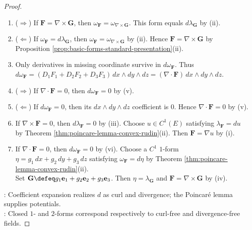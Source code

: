 \begin{theorem}
\begin{proof}
\begin{enumerate}[label=(\roman*)]
\item[$(iv)$] ($\Rightarrow$) If $\mathbf{F}=\nabla\times\mathbf{G}$, then $\omega_{\mathbf{F}}=\omega_{\nabla\times\mathbf{G}}$. This form equals $d\lambda_{\mathbf{G}}$ by (ii).
\item[$(iv)$] ($\Leftarrow$) If $\omega_{\mathbf{F}}=d\lambda_{\mathbf{G}}$, then $\omega_{\mathbf{F}}=\omega_{\nabla\times\mathbf{G}}$ by (ii). Hence $\mathbf{F}=\nabla\times\mathbf{G}$ by Proposition \ref{prop:basic-forms-standard-presentation}(ii).
\item[$(v)$] Only derivatives in missing coordinate survive in $d\omega_{\mathbf{F}}$. Thus $d\omega_{\mathbf{F}}=(D_1F_1+D_2F_2+D_3F_3)\,dx\wedge dy\wedge dz=(\nabla\cdot\mathbf{F})\,dx\wedge dy\wedge dz$.
\item[$(vi)$] ($\Rightarrow$) If $\nabla\cdot\mathbf{F}=0$, then $d\omega_{\mathbf{F}}=0$ by (v).
\item[$(vi)$] ($\Leftarrow$) If $d\omega_{\mathbf{F}}=0$, then its $dx\wedge dy\wedge dz$ coefficient is $0$. Hence $\nabla\cdot\mathbf{F}=0$ by (v).
\item[$(vii)$] If $\nabla\times\mathbf{F}=0$, then $d\lambda_{\mathbf{F}}=0$ by (iii). Choose $u\in C^1(E)$ satisfying $\lambda_{\mathbf{F}}=du$ by Theorem \ref{thm:poincare-lemma-convex-rudin}(ii). Then $\mathbf{F}=\nabla u$ by (i).
\item[$(viii)$] If $\nabla\cdot\mathbf{F}=0$, then $d\omega_{\mathbf{F}}=0$ by (vi). Choose a $C^1$ $1$-form $\eta=g_1\,dx+g_2\,dy+g_3\,dz$ satisfying $\omega_{\mathbf{F}}=d\eta$ by Theorem \ref{thm:poincare-lemma-convex-rudin}(ii).\\
Set $\mathbf{G}\defeq g_1\mathbf{e}_1+g_2\mathbf{e}_2+g_3\mathbf{e}_3$. Then $\eta=\lambda_{\mathbf{G}}$ and $\mathbf{F}=\nabla\times\mathbf{G}$ by (iv).
\end{enumerate}
: Coefficient expansion realizes $d$ as curl and divergence; the Poincar\'e lemma supplies potentials.\\
: Closed $1$- and $2$-forms correspond respectively to curl-free and divergence-free fields.
\end{proof}
\end{theorem}

